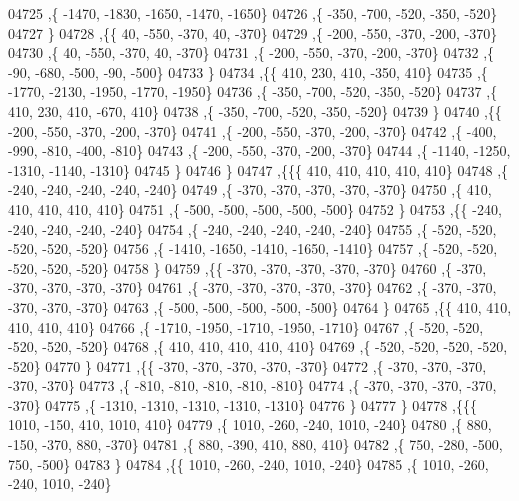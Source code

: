 \begin{DoxyCode}
04725     ,\{ -1470, -1830, -1650, -1470, -1650\}
04726     ,\{  -350,  -700,  -520,  -350,  -520\}
04727     \}
04728    ,\{\{    40,  -550,  -370,    40,  -370\}
04729     ,\{  -200,  -550,  -370,  -200,  -370\}
04730     ,\{    40,  -550,  -370,    40,  -370\}
04731     ,\{  -200,  -550,  -370,  -200,  -370\}
04732     ,\{   -90,  -680,  -500,   -90,  -500\}
04733     \}
04734    ,\{\{   410,   230,   410,  -350,   410\}
04735     ,\{ -1770, -2130, -1950, -1770, -1950\}
04736     ,\{  -350,  -700,  -520,  -350,  -520\}
04737     ,\{   410,   230,   410,  -670,   410\}
04738     ,\{  -350,  -700,  -520,  -350,  -520\}
04739     \}
04740    ,\{\{  -200,  -550,  -370,  -200,  -370\}
04741     ,\{  -200,  -550,  -370,  -200,  -370\}
04742     ,\{  -400,  -990,  -810,  -400,  -810\}
04743     ,\{  -200,  -550,  -370,  -200,  -370\}
04744     ,\{ -1140, -1250, -1310, -1140, -1310\}
04745     \}
04746    \}
04747   ,\{\{\{   410,   410,   410,   410,   410\}
04748     ,\{  -240,  -240,  -240,  -240,  -240\}
04749     ,\{  -370,  -370,  -370,  -370,  -370\}
04750     ,\{   410,   410,   410,   410,   410\}
04751     ,\{  -500,  -500,  -500,  -500,  -500\}
04752     \}
04753    ,\{\{  -240,  -240,  -240,  -240,  -240\}
04754     ,\{  -240,  -240,  -240,  -240,  -240\}
04755     ,\{  -520,  -520,  -520,  -520,  -520\}
04756     ,\{ -1410, -1650, -1410, -1650, -1410\}
04757     ,\{  -520,  -520,  -520,  -520,  -520\}
04758     \}
04759    ,\{\{  -370,  -370,  -370,  -370,  -370\}
04760     ,\{  -370,  -370,  -370,  -370,  -370\}
04761     ,\{  -370,  -370,  -370,  -370,  -370\}
04762     ,\{  -370,  -370,  -370,  -370,  -370\}
04763     ,\{  -500,  -500,  -500,  -500,  -500\}
04764     \}
04765    ,\{\{   410,   410,   410,   410,   410\}
04766     ,\{ -1710, -1950, -1710, -1950, -1710\}
04767     ,\{  -520,  -520,  -520,  -520,  -520\}
04768     ,\{   410,   410,   410,   410,   410\}
04769     ,\{  -520,  -520,  -520,  -520,  -520\}
04770     \}
04771    ,\{\{  -370,  -370,  -370,  -370,  -370\}
04772     ,\{  -370,  -370,  -370,  -370,  -370\}
04773     ,\{  -810,  -810,  -810,  -810,  -810\}
04774     ,\{  -370,  -370,  -370,  -370,  -370\}
04775     ,\{ -1310, -1310, -1310, -1310, -1310\}
04776     \}
04777    \}
04778   ,\{\{\{  1010,  -150,   410,  1010,   410\}
04779     ,\{  1010,  -260,  -240,  1010,  -240\}
04780     ,\{   880,  -150,  -370,   880,  -370\}
04781     ,\{   880,  -390,   410,   880,   410\}
04782     ,\{   750,  -280,  -500,   750,  -500\}
04783     \}
04784    ,\{\{  1010,  -260,  -240,  1010,  -240\}
04785     ,\{  1010,  -260,  -240,  1010,  -240\}

\end{DoxyCode}
